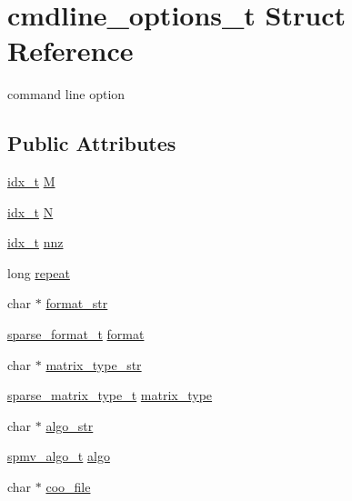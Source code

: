 \hypertarget{structcmdline__options__t}{}\section{cmdline\+\_\+options\+\_\+t Struct Reference}
\label{structcmdline__options__t}


command line option  


\subsection*{Public Attributes}
\begin{DoxyCompactItemize}
\item 
\hyperlink{spmv_8cc_a8e93478a00e685bea5e6a3f617bf03a3}{idx\+\_\+t} \hyperlink{structcmdline__options__t_aeb40f98dbcd53dc727b1d7dbb566924f}{M}
\item 
\hyperlink{spmv_8cc_a8e93478a00e685bea5e6a3f617bf03a3}{idx\+\_\+t} \hyperlink{structcmdline__options__t_aa58f87808071259b5aa8f17c64bf2960}{N}
\item 
\hyperlink{spmv_8cc_a8e93478a00e685bea5e6a3f617bf03a3}{idx\+\_\+t} \hyperlink{structcmdline__options__t_aec8f7846348926cda6d62023f62d0d25}{nnz}
\item 
long \hyperlink{structcmdline__options__t_acb60cada2976487316be88bf4309e7d6}{repeat}
\item 
char $\ast$ \hyperlink{structcmdline__options__t_a16fe2748dfda1fc639d7e3321eb0e4a9}{format\+\_\+str}
\item 
\hyperlink{spmv_8cc_a8c0094893526c01b430903b2d9227256}{sparse\+\_\+format\+\_\+t} \hyperlink{structcmdline__options__t_af8a99d8cdebe0bc5fd512d2254727231}{format}
\item 
char $\ast$ \hyperlink{structcmdline__options__t_a1669264b4602341b949007ca4336dfc2}{matrix\+\_\+type\+\_\+str}
\item 
\hyperlink{spmv_8cc_a43a568fb26bc32aeaad07769cc524c45}{sparse\+\_\+matrix\+\_\+type\+\_\+t} \hyperlink{structcmdline__options__t_abc77475ac02e2e93b9f978ea22cb6244}{matrix\+\_\+type}
\item 
char $\ast$ \hyperlink{structcmdline__options__t_ae8ab407cdc87a30c1b4cdf6b424c8370}{algo\+\_\+str}
\item 
\hyperlink{spmv_8cc_ad2cf0493af54bf76c5be68b4634fcab7}{spmv\+\_\+algo\+\_\+t} \hyperlink{structcmdline__options__t_afddf83f65e6e4a14761d84a5e876e6ac}{algo}
\item 
char $\ast$ \hyperlink{structcmdline__options__t_a2db02208284cd9664c88e6f0e7140d6d}{coo\+\_\+file}

\end{DoxyCompactItemize}
